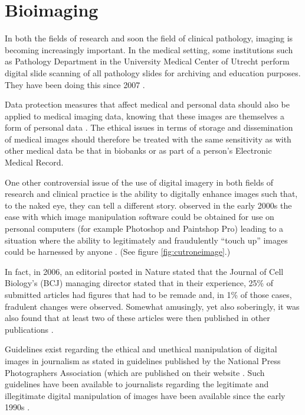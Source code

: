 \documentclass[british,a4paper, 12pt]{article}
\begin{document}
\section{Bioimaging}
In both the fields of research and soon the field of clinical pathology, imaging is becoming 
increasingly important. In the medical setting, some institutions such as Pathology Department 
in the University Medical Center of Utrecht perform digital slide scanning of all pathology 
slides for archiving and education purposes. They have been doing this since 2007
\parencite{stathonikos2013going}.

Data protection measures that affect medical and personal data should also be 
applied to medical imaging data, knowing that these images are themselves a form 
of personal data \parencite{duquenoy2008considering}. The ethical issues in terms of storage
and dissemination of medical images should therefore be treated with the same
sensitivity as with other medical data be that in biobanks or as part of a person's Electronic
Medical Record.

One other controversial issue of the use of digital imagery in both fields of research and 
clinical practice is the ability to digitally enhance images such that, to the naked eye, they 
can tell a different story. \citeauthor*{cutrone2001true} observed in the early 2000s the ease 
with which image manipulation software could be obtained for use on personal computers  (for example
Photoshop and Paintshop Pro) leading to a situation where the ability to legitimately and 
fraudulently ``touch up'' images could be harnessed by anyone \parencite{cutrone2001true}. (See
figure \ref{fig:cutroneimage}.)

In fact, in 2006, an editorial posted in Nature stated that the Journal of Cell Biology's (BCJ)
managing director stated that in their experience, 25\% of submitted articles had figures that
had to be remade and, in 1\% of those cases, fradulent changes were observed. Somewhat amusingly,
yet also soberingly, it was also found that at least two of these articles were then published
in other publications \parencite{cromey2009digital}.

Guidelines exist regarding the ethical and unethical manipulation of digital images in journalism as
stated in guidelines published by the National Press Photographers Association (which are
published on their website \parencite{national2012ethics}. Such guidelines have been available to
journalists regarding the legitimate and illegitimate digital manipulation of images have been
available since the early 1990s \parencite{cromey2010avoiding}.
\end{document}
